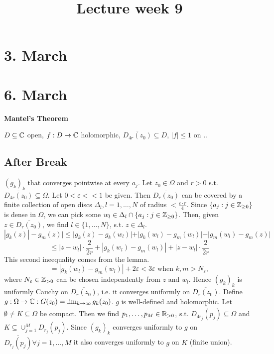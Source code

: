 \title{Lecture week 9}
\section{3. March}



\section{6. March}
\begin{theorem}
  \textbf{Mantel's Theorem}
  \newline
\end{theorem}
\begin{lemma}
  $D \subseteq \mathbb{C}$ open, $f: D\to \mathbb{C}$ holomorphic, $\overline{D_{4r}(z_0)}\subseteq D$, $|f| \leq 1$ on $.$.
\end{lemma}
\subsection{After Break}
$(g_k)_k$ that converges pointwise at every $a_j$. Let $z_0 \in \Omega$ and $r>0$ s.t. $\overline{D_{4r}(z_0)}\subseteq \Omega$. Let $0 < \varepsilon << 1$ be given. Then $\overline{D_{r}(z_0)}$ can be covered by a finite collection of open discs $\Delta_l, l=1,\dots, N$ of radius $< \frac{\varepsilon \cdot r}{4}$. Since $\{a_j : j\in \mathbb{Z}_{\geq 0}\}$
is dense in $\Omega$, we can pick some $w_l \in \Delta_l \cap \{a_j : j\in \mathbb{Z}_{\geq 0}\}$. Then, given $z \in \overline{D_r(z_0)}$, we find $l\in \{1, \dots, N\}$, s.t. $z\in \Delta_l$.
$$|g_k(z)|-g_m(z)|\leq |g_k(z)-g_k(w_l)|+|g_k(w_l)-g_m(w_l)|+|g_m(w_l)-g_m(z)|$$
$$\leq |z-w_l| \cdot \frac{2}{2r} + |g_k(w_l)-g_m(w_l)|+|z-w_l| \cdot \frac{2}{2r}$$
This second ineequality comes from the lemma.
$$=|g_k(w_l)-g_m(w_l)|+2\varepsilon < 3 \varepsilon \text{ when }k,m >N_{\varepsilon},$$
where $N_{\varepsilon}\in \mathbb{Z}_{>0}$ can be chosen independently from $z$ and $w_l$.
Hence $(g_k)_k$ is uniformly Cauchy on $\overline{D_r(z_0)}$, i.e. it converges uniformly on $\overline{D_r(z_0)}$. Define $g: \Omega \to \mathbb{C}: G(z_0) = \lim_{k\to \infty}g_k(z_0)$. $g$ is well-defined and holomorphic. Let $\emptyset\neq K \subseteq \Omega$ be compact. Then we find $p_1, \dots, p_M \in \mathbb{R}_{>0}$, s.t. $\overline{D_{4r_j}(p_j)} \subseteq \Omega$
and $K \subseteq \cup_{j=1}^M D_{r_j}(p_j)$. Since $(g_k)_k$ converges uniformly to $g$ on $\overline{D_{r_j}(p_j)} \forall j =1, \dots, M$ it also converges uniformly to $g$ on $K$ (finite union).
